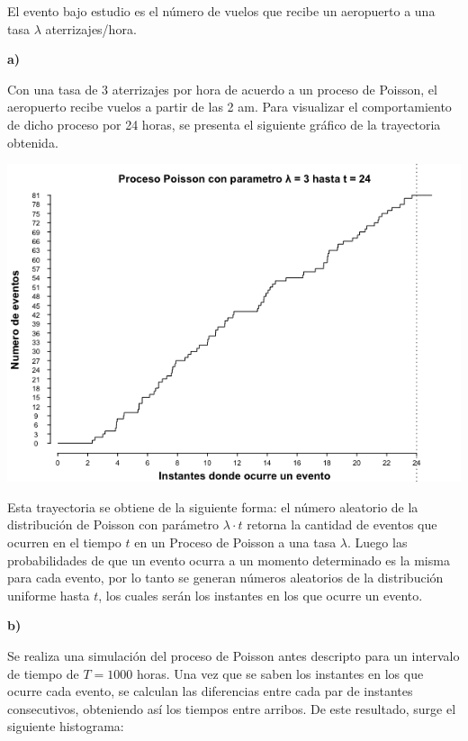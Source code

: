 \documentclass[11pt]{article}
\begin{document}
El evento bajo estudio es el número de vuelos que recibe un aeropuerto a una tasa $\lambda$ aterrizajes/hora.

\textbf{a)}

Con una tasa de 3 aterrizajes por hora de acuerdo a un proceso de Poisson, el aeropuerto recibe vuelos a partir de las 2 am. Para visualizar el comportamiento de dicho proceso por 24 horas, se presenta el siguiente gráfico de la trayectoria obtenida.

\hspace{-1.9cm}\includegraphics[scale = 0.8]{poissonEJ6.png}

Esta trayectoria se obtiene de la siguiente forma: el número aleatorio de la distribución de Poisson con parámetro $\lambda \cdot t$ retorna la cantidad de eventos que ocurren en el tiempo $t$ en un Proceso de Poisson a una tasa $\lambda$. Luego las probabilidades de que un evento ocurra a un momento determinado es la misma para cada evento, por lo tanto se generan números aleatorios de la distribución uniforme hasta $t$, los cuales serán los instantes en los que ocurre un evento.


\textbf{b)}

Se realiza una simulación del proceso de Poisson antes descripto para un intervalo de tiempo de $T = 1000$ horas. Una vez que se saben los instantes en los que ocurre cada evento, se calculan las diferencias entre cada par de instantes consecutivos, obteniendo así los tiempos entre arribos. De este resultado, surge el siguiente histograma:
\end{document}
